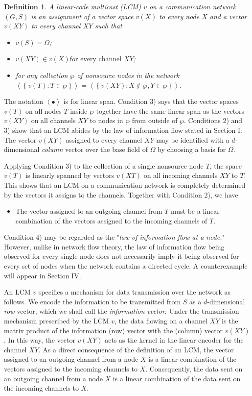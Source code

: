 \documentclass{IEEEtran}
\newtheorem{defi}{Definition}
\begin{document}
\begin{defi}
	A \emph{linear-code multicast (LCM)} $v$ on a communication network $(G,S)$ is an assignment of a vector space $v(X)$	to every node $X$ and a vector $v(XY)$ to every channel $XY$ such that
	\begin{itemize}
		\item[1)] $v(S)=\Omega$;
		\item[2)] $v(XY) \in v(X) \text{for every channel } XY$;
		\item[3)] for any collection $\wp$ of nonsource nodes in the network\\
		$ \left \langle \left \{ v(T):T\in \wp \right \} \right \rangle=\left \langle \left \{ v(XY):X\notin \wp,Y\in \wp \right \} \right \rangle$.
	\end{itemize}
\end{defi}
\par 
The notation $\left \langle \bullet \right \rangle $ is for linear span. Condition 3) says that the vector spaces $v(T)$ on all nodes $T$ inside $\wp$ together have the same linear span as the vectors $v(XY)$ on all channels $XY$ to nodes in $\wp$ from outside of $\wp$. Conditions 2) and 3) show that an LCM abides by the law of information flow stated in Section I. The vector $v(XY)$ assigned to every channel $XY$ may be identified with a $d$-dimensional \emph{column} vector over the base field of $\Omega$ by choosing a basis for $\Omega$.
\par 
Applying Condition 3) to the collection of a single nonsource node $T$, the space $v(T)$ is linearly spanned by vectors $v(XT)$ on all incoming channels $XY$ to $T$. This shows that an LCM on a communication network is completely determined by the vectors it assigns to the channels. Together with Condition 2), we have
\begin{itemize}
	\item[4)] The vector assigned to an outgoing channel from $T$ must be a linear combination of the vectors assigned to the incoming	channels of $T$.
\end{itemize}
Condition 4) may be regarded as the "\emph{law of information flow at a node.}" However, unlike in network flow theory, the law of information flow being observed for every single node does not necessarily imply it being observed for every set of nodes when the network contains a directed cycle. A counterexample will appear in Section IV.
\par 
An LCM $v$ specifies a mechanism for data transmission over the network as follows. We encode the information to be transmitted from $S$ as a $d$-dimensional \emph{row} vector, which we shall call the \emph{information vector}. Under the transmission mechanism prescribed by the LCM $v$, the data flowing on a channel $XY$ is the matrix product of the information (row) vector with the (column) vector $v(XY)$. In this way, the vector $v(XY)$ acts as the kernel in the linear encoder for the channel $XY$. As a direct consequence of the definition of an LCM, the vector assigned to an outgoing channel from a node $X$ is a linear combination of the vectors assigned to the incoming channels to $X$. Consequently, the data sent on an outgoing channel from a node $X$ is a linear combination of the data sent on the incoming channels to $X$.
\end{document}
